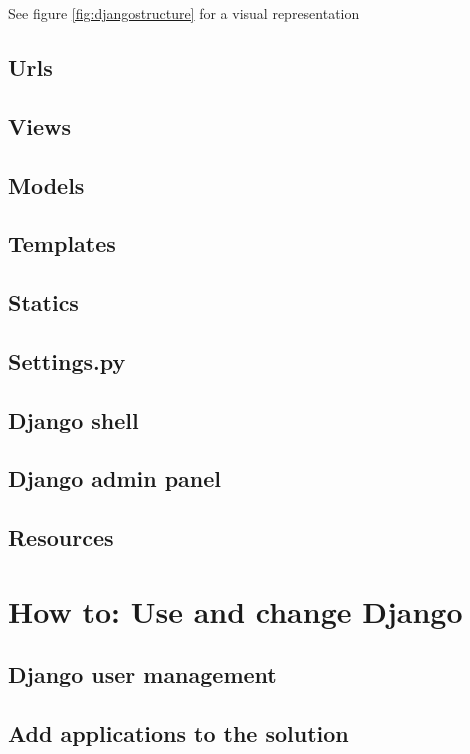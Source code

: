 \documentclass{report}
\begin{document}
See figure \ref{fig:djangostructure} for a visual representation

\subsection{Urls} \label{django:urls}
\subsection{Views} \label{django:views}
\subsection{Models} \label{django:models}
\subsection{Templates} \label{django:templates}
\subsection{Statics} \label{django:static}
\subsection{Settings.py} \label{django:settings}
\subsection{Django shell} \label{django:shell}
\subsection{Django admin panel} \label{django:adminpanel}
\subsection{Resources} \label{django:resources}

\section{How to: Use and change Django} \label{sec:use_and_change_django}
\subsection{Django user management} 
\subsection{Add applications to the solution}
\end{document}
